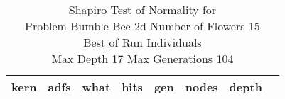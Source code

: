 \begin{table}[H]
\caption{Shapiro Test of Normality for \\ Problem  Bumble Bee 2d  Number of Flowers 15\\Best of Run Individuals \\ Max Depth 17 Max Generations 104\\}
\begin{center}
\scalebox{0.8} %
{
\begin{tabular}{lrrrrrrr}
\hline
kern & adfs & what & hits & gen & nodes & depth \\
\hline


\end{tabular}
}
\end{center}
\end{table}

